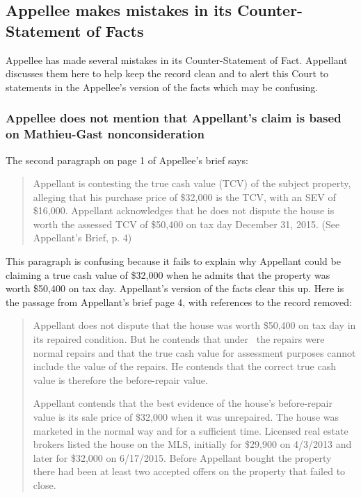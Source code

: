 \documentclass[12pt,\documentclassflag]{michiganCourtOfAppealsBrief}
\begin{document}
\subsection{Appellee makes mistakes in its Counter-Statement of Facts}

Appellee has made several mistakes in its Counter-Statement of Fact. Appellant discusses them here to help keep the record clean and to alert this Court to statements in the Appellee's version of the facts which may be confusing.

\subsubsection{Appellee does not mention that Appellant's claim is based on Mathieu-Gast nonconsideration}


The second paragraph on page 1 of Appellee's brief says:

\begin{quote}
Appellant is contesting the true cash value (TCV) of the subject property, alleging that his
purchase price of \$32,000 is the TCV, with an SEV of \$16,000. Appellant acknowledges that he
does not dispute the house is worth the assessed TCV of \$50,400 on tax day December 31, 2015. (See Appellant's Brief, p. 4)
\end{quote}

This paragraph is confusing because it fails to explain why Appellant could be claiming a true cash value of \$32,000 when he admits that the property was worth \$50,400 on tax day. Appellant's version of the facts clear this up. Here is the passage from Appellant's brief page 4, with references to the record removed:

\begin{quotation}
  Appellant does not dispute that the house was worth \$50,400 on tax day in its repaired condition. But he contends that under \mathieuGast\ the repairs were normal repairs and that the true cash value for assessment purposes cannot include the value of the repairs. He contends that the correct true cash value is therefore the before-repair value. 

Appellant contends that the best evidence of the house's before-repair value is its sale price of \$32,000 when it was unrepaired. The house was marketed in the normal way and for a sufficient time. Licensed real estate brokers listed the house on the MLS, initially for \$29,900 on 4/3/2013 and later for \$32,000 on 6/17/2015. Before Appellant bought the property there had been at least two accepted offers on the property that failed to close.
\end{quotation}
\end{document}

